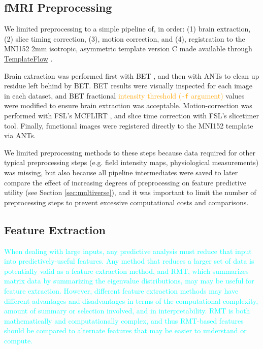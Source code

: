 \documentclass[12pt]{spieman}  %
\begin{document}
\begin{spacing}{2}
\subsection{fMRI Preprocessing}
\label{sec:preproc}

We limited preprocessing to a simple pipeline of, in order: (1) brain
extraction, (2) slice timing correction, (3), motion correction, and (4),
registration to the MNI152
\cite{fonovUnbiasedAverageAgeappropriate2011, fonovUnbiasedNonlinearAverage2009}
2mm isotropic, asymmetric template version C made available through
\href{https://www.templateflow.org/}{TemplateFlow}
\cite{ciricTemplateFlowFAIRsharingMultiscale2021}.

Brain extraction was performed first with BET
\cite{smithFastRobustAutomated2002}, and then with
ANTs\cite{avantsReproducibleEvaluationANTs2011} to clean up residue left behind
by BET. BET results were visually inspected for each image in each dataset, and
BET fractional \textcolor{orange}{intensity threshold (\texttt{-f}
argument)} values were modified to ensure brain extraction was acceptable.
Motion-correction was performed with FSL's MCFLIRT
\cite{jenkinsonImprovedOptimizationRobust2002}, and slice time correction
with FSL's slicetimer\cite{jenkinsonFSL2012} tool. Finally, functional
images were registered directly to the MNI152 template via
ANTs\cite{avantsReproducibleEvaluationANTs2011}.

We limited preprocessing methods to these steps because data required for other
typical preprocessing steps (e.g. field intensity maps, physiological
measurements) was missing, but also because all pipeline intermediates were
saved to later compare the effect of increasing degrees of preprocessing on
feature predictive utility (see Section \ref{sec:multiverse}), and it was
important to limit the number of preprocessing steps to prevent excessive
computational costs and comparisons.



\subsection{Feature Extraction}

\textcolor{cyan}{When dealing with large inputs, any predictive analysis must
reduce that input into predictively-useful features. Any method that reduces a
larger set of data is potentially valid as a feature extraction method, and RMT,
which summarizes matrix data by summarizing the eigenvalue distributions, may
may be useful for feature extraction. However, different feature
extraction methods may have different advantages and disadvantages in terms of
the computational complexity, amount of summary or selection involved, and in
interpretability. RMT is both mathematically and computationally complex, and
thus RMT-based features should be compared to alternate features that may be
easier to understand or compute.}


\end{spacing}
\end{document}
